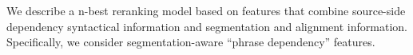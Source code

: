 We describe a n-best reranking model based on features that combine source-side dependency syntactical information and segmentation and alignment information. Specifically, we consider segmentation-aware ``phrase dependency'' features.
